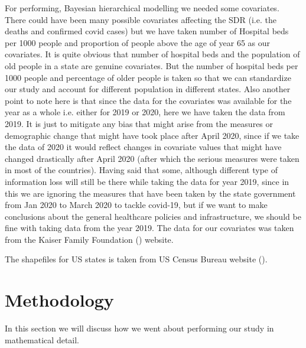 \documentclass[enabledeprecatedfontcommands,parskip=half,twoside=semi,BCOR=0mm]{scrreprt}
\numberwithin{equation}{chapter}
\theoremstyle{definition}
\theoremstyle{remark}
\begin{document}
    For performing, Bayesian  hierarchical modelling we needed some covariates. There could have been many possible covariates affecting the SDR (i.e. the deaths and confirmed covid cases) but we have taken number of Hospital beds per 1000 people and proportion of people above the age of year 65 as our covariates. It is quite obvious that number of hospital beds and the population of old people in a state are genuine covariates. But the number of hospital beds per 1000 people and  percentage of older people is taken so that we can standardize our study and account for different population in different states. Also another point to note here is that since the data for the covariates was available for the year as a whole i.e. either for 2019 or 2020, here we have taken the data from 2019. It is just to mitigate any bias that might arise from the measures or demographic change that might have took place after April 2020, since if we take the data of 2020 it would reflect changes in covariate values that might have changed drastically after April 2020 (after which the serious measures were taken in most of the countries). Having said that some, although different type of information loss will still be there while taking the data for year 2019, since in this we are ignoring the measures that have been taken by the state government from Jan 2020 to March 2020 to tackle covid-19, but if we want to make conclusions about the general healthcare policies and infrastructure, we should be fine with taking data from the year 2019. The data for our covariates was taken from the Kaiser Family Foundation (\cite{KFF}) website.

    The shapefiles for US states is taken from US Census Bureau website (\cite{USBC}).
    \chapter{Methodology}
    In this section we will discuss how we went about performing our study in mathematical detail. 
\end{document}
